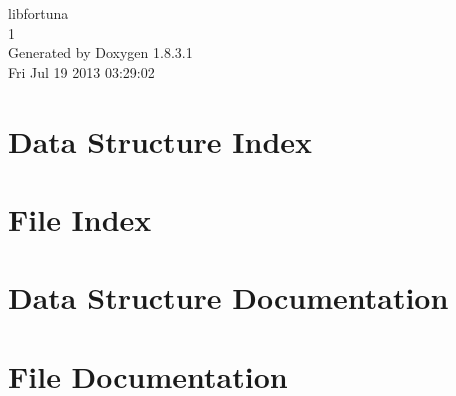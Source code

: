 \documentclass{book}
\begin{document}
\hypersetup{pageanchor=false,citecolor=blue}
\begin{titlepage}
\vspace*{7cm}
\begin{center}
{\Large libfortuna \\[1ex]\large 1 }\\
\vspace*{1cm}
{\large Generated by Doxygen 1.8.3.1}\\
\vspace*{0.5cm}
{\small Fri Jul 19 2013 03:29:02}\\
\end{center}
\end{titlepage}
\clearemptydoublepage
{}
\tableofcontents
\clearemptydoublepage
{}
\hypersetup{pageanchor=true,citecolor=blue}
\chapter{Data Structure Index}

\chapter{File Index}

\chapter{Data Structure Documentation}
















\chapter{File Documentation}


















\printindex
\end{document}
